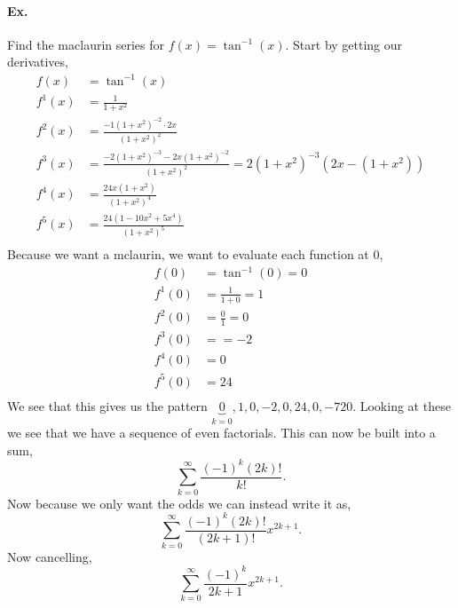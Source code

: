 \begin{exampleblock}{}
	\paragraph{Ex.}
	Find the maclaurin series for $ f\left( x \right) = \tan^{ -1 } \left( x \right)  $. Start by getting our derivatives,
	\begin{align*}
		f\left( x \right) &= \tan^{ -1 } \left( x \right) \\
		f^{ 1 }\left( x \right) &= \frac{ 1 }{ 1+x^2 } \\
		f^{ 2 }\left( x \right) &= \frac{ -1\left( 1+x^2 \right) ^{ -2 }\cdot 2x }{ \left( 1+x^2 \right) ^2 } \\
		f^{ 3 }\left( x \right) &= \frac{ -2\left( 1+x^2 \right)^{ -3 } -2x\left( 1+x^2 \right)^{ -2 }  }{ \left( 1+x^2 \right) ^2 } = 2\left( 1+x^2 \right) ^{ -3 }\left( 2x-\left( 1+x^2 \right) \right) \\
		f^{ 4 }\left( x \right) &=  \frac{ 24x\left( 1+x^2 \right)  }{ \left( 1+x^2 \right) ^{ 4 } }  \\
		f^{ 5 }\left( x \right) &= \frac{ 24\left( 1-10x^2+5x^{ 4 } \right)  }{ \left( 1+x^2 \right) ^{ 5 } } \\
	\end{align*}
	Because we want a mclaurin, we want to evaluate each function at 0,
	\begin{align*}
		f\left( 0 \right) &= \tan^{ -1 } \left( 0 \right) = 0 \\
		f^{ 1 }\left( 0 \right) &= \frac{ 1 }{ 1+0 } = 1 \\
		f^{ 2 }\left( 0 \right) &= \frac{ 0 }{ 1 } = 0 \\
		f^{ 3 }\left( 0 \right) &= = -2 \\
		f^{ 4 }\left( 0 \right) &= 0 \\
		f^{ 5 }\left( 0 \right) &= 24 \\
	\end{align*}
	We see that this gives us the pattern $ \underbrace{ 0 }_{ k=0 } ,1,0,-2,0,24,0,-720 $. Looking at these we see that we have a sequence of even factorials. This can now be built into a sum,
	\[
	\sum_{ k=0 } ^{ \infty } \frac{ \left( -1 \right) ^{ k }\left( 2k \right) ! }{ k! }
	.\] 
	Now because we only want the odds we can instead write it as,
	\[
	\sum_{ k=0 } ^{ \infty } \frac{ \left( -1 \right) ^{ k }\left( 2k \right) ! }{ \left(2k+1\right)! }x^{ 2k+1 }
	.\] 
	Now cancelling,
	\[
	\sum_{ k=0 } ^{ \infty } \frac{ \left( -1 \right) ^{ k } }{ 2k+1 }x^{ 2k+1 }
	.\] 

\end{exampleblock}
